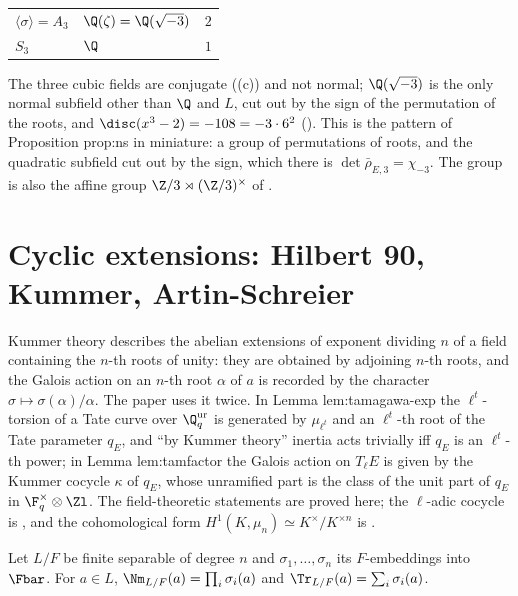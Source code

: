 \begin{example}
\begin{center}
\begin{tabular}{lll}
$\langle\sigma\rangle=A_3$ & $\Q(\zeta)=\Q(\sqrt{-3})$ & $2$\\
$S_3$ & $\Q$ & $1$\\
\bottomrule
\end{tabular}
\end{center}
The three cubic fields are conjugate ((c)) and not normal; $\Q(\sqrt{-3})$ is the only normal subfield other than $\Q$ and $L$, cut out by the sign of
the permutation of the roots, and $\disc(x^3-2)=-108=-3\cdot6^2$ (). This is the pattern of Proposition prop:ns in miniature: a
group of permutations of roots, and the quadratic subfield cut out by the sign, which there is $\det\bar\rho_{E,3}=\chi_{-3}$. The group is also the affine group
$\Z/3\rtimes(\Z/3)^\times$ of .
\end{example}

\section[Hilbert 90, Kummer theory, Artin-Schreier]{Cyclic extensions: Hilbert 90, Kummer, Artin-Schreier}\label{sec:galois:kummer}

Kummer theory describes the abelian extensions of exponent dividing $n$ of a field containing the $n$-th roots of unity: they are obtained by
adjoining $n$-th roots, and the Galois action on an $n$-th root $\alpha$ of $a$ is recorded by the character $\sigma\mapsto\sigma(\alpha)/\alpha$. The paper uses
it twice. In Lemma lem:tamagawa-exp the $\ell^t$-torsion of a Tate curve over $\Q_q^{\mathrm{ur}}$ is generated by $\mu_{\ell^t}$ and an $\ell^t$-th root of the Tate
parameter $q_E$, and ``by Kummer theory'' inertia acts trivially iff $q_E$ is an $\ell^t$-th power; in Lemma lem:tamfactor the Galois action on $T_\ell E$ is given by
the Kummer cocycle $\kappa$ of $q_E$, whose unramified part is the class of the unit part of $q_E$ in $\F_q^\times\otimes\Zl$. The field-theoretic statements are
proved here; the $\ell$-adic cocycle is , and the cohomological form $H^1(K,\mu_n)\simeq K^\times/K^{\times n}$ is .

\begin{definition}\label{def:galois:norm-trace}
Let $L/F$ be finite separable of degree $n$ and $\sigma_1,\dots,\sigma_n$ its $F$-embeddings into $\Fbar$. For $a\in L$,
$\Nm_{L/F}(a)=\prod_i\sigma_i(a)$ and $\Tr_{L/F}(a)=\sum_i\sigma_i(a)$.
\end{definition}

